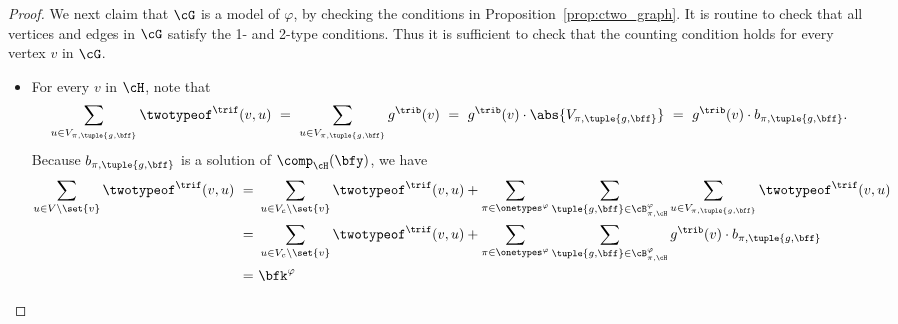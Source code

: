 \begin{proof}
    We next claim that $\cG$ is a model of $\varphi$, by checking the conditions in Proposition~\ref{prop:ctwo_graph}.
    It is routine to check that all vertices and edges in $\cG$ satisfy the 1- and 2-type conditions.
    Thus it is sufficient to check that the counting condition holds for every vertex $v$ in $\cG$.
    \begin{itemize}
        \item
        For every $v$ in $\cH$, note that
        \begin{equation*}
            \sum_{u \in V_{\pi, \tuple{g, \bff}}} \twotypeof^\trif(v, u) 
            \ =\ 
            \sum_{u \in V_{\pi, \tuple{g, \bff}}} g^\trib(v)
            \ =\ 
            g^\trib(v) \cdot \abs{V_{\pi, \tuple{g, \bff}}}
            \ =\ 
            g^\trib(v) \cdot b_{\pi, \tuple{g, \bff}}.
        \end{equation*}
        Because $b_{\pi, \tuple{g, \bff}}$ is a solution of $\comp_{\cH}(\bfy)$, we have
        \begin{equation*}
            \begin{aligned}
                \sum_{u \in V \setminus \set{v}} \twotypeof^\trif(v, u)
                \ =\ &
                \sum_{u \in V_c \setminus \set{v}} \twotypeof^\trif(v, u) +
                \sum_{\pi \in \onetypes^\varphi}\sum_{\tuple{g, \bff} \in \cB^\varphi_{\pi, \cH}}\sum_{u \in V_{\pi, \tuple{g, \bff}}} \twotypeof^\trif(v, u) \\
                \ =\ &
                \sum_{u \in V_c \setminus \set{v}} \twotypeof^\trif(v, u) +
                \sum_{\pi \in \onetypes^\varphi}\sum_{\tuple{g, \bff} \in \cB^\varphi_{\pi, \cH}} g^\trib(v)\cdot b_{\pi, \tuple{g, \bff}} \\
                \ =\ &
                \bfk^\varphi
            \end{aligned}
        \end{equation*}


\end{itemize}
\end{proof}
